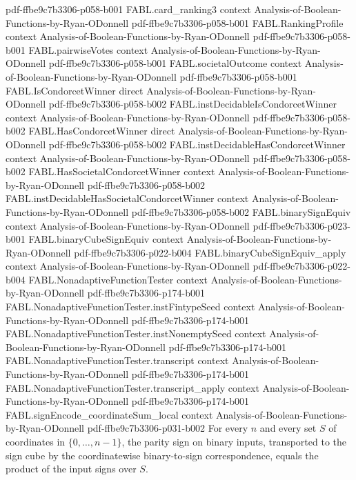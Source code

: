 \begin{theorem}
  {pdf-ffbe9c7b3306-p058-b001}
\proofstep
  {FABL.card_ranking3}
  {context}
  {Analysis-of-Boolean-Functions-by-Ryan-ODonnell}
  {pdf-ffbe9c7b3306-p058-b001}
\proofstep
  {FABL.RankingProfile}
  {context}
  {Analysis-of-Boolean-Functions-by-Ryan-ODonnell}
  {pdf-ffbe9c7b3306-p058-b001}
\proofstep
  {FABL.pairwiseVotes}
  {context}
  {Analysis-of-Boolean-Functions-by-Ryan-ODonnell}
  {pdf-ffbe9c7b3306-p058-b001}
\proofstep
  {FABL.societalOutcome}
  {context}
  {Analysis-of-Boolean-Functions-by-Ryan-ODonnell}
  {pdf-ffbe9c7b3306-p058-b001}
\proofstep
  {FABL.IsCondorcetWinner}
  {direct}
  {Analysis-of-Boolean-Functions-by-Ryan-ODonnell}
  {pdf-ffbe9c7b3306-p058-b002}
\proofstep
  {FABL.instDecidableIsCondorcetWinner}
  {context}
  {Analysis-of-Boolean-Functions-by-Ryan-ODonnell}
  {pdf-ffbe9c7b3306-p058-b002}
\proofstep
  {FABL.HasCondorcetWinner}
  {direct}
  {Analysis-of-Boolean-Functions-by-Ryan-ODonnell}
  {pdf-ffbe9c7b3306-p058-b002}
\proofstep
  {FABL.instDecidableHasCondorcetWinner}
  {context}
  {Analysis-of-Boolean-Functions-by-Ryan-ODonnell}
  {pdf-ffbe9c7b3306-p058-b002}
\proofstep
  {FABL.HasSocietalCondorcetWinner}
  {context}
  {Analysis-of-Boolean-Functions-by-Ryan-ODonnell}
  {pdf-ffbe9c7b3306-p058-b002}
\proofstep
  {FABL.instDecidableHasSocietalCondorcetWinner}
  {context}
  {Analysis-of-Boolean-Functions-by-Ryan-ODonnell}
  {pdf-ffbe9c7b3306-p058-b002}
\proofstep
  {FABL.binarySignEquiv}
  {context}
  {Analysis-of-Boolean-Functions-by-Ryan-ODonnell}
  {pdf-ffbe9c7b3306-p023-b001}
\proofstep
  {FABL.binaryCubeSignEquiv}
  {context}
  {Analysis-of-Boolean-Functions-by-Ryan-ODonnell}
  {pdf-ffbe9c7b3306-p022-b004}
\proofstep
  {FABL.binaryCubeSignEquiv_apply}
  {context}
  {Analysis-of-Boolean-Functions-by-Ryan-ODonnell}
  {pdf-ffbe9c7b3306-p022-b004}
\proofstep
  {FABL.NonadaptiveFunctionTester}
  {context}
  {Analysis-of-Boolean-Functions-by-Ryan-ODonnell}
  {pdf-ffbe9c7b3306-p174-b001}
\proofstep
  {FABL.NonadaptiveFunctionTester.instFintypeSeed}
  {context}
  {Analysis-of-Boolean-Functions-by-Ryan-ODonnell}
  {pdf-ffbe9c7b3306-p174-b001}
\proofstep
  {FABL.NonadaptiveFunctionTester.instNonemptySeed}
  {context}
  {Analysis-of-Boolean-Functions-by-Ryan-ODonnell}
  {pdf-ffbe9c7b3306-p174-b001}
\proofstep
  {FABL.NonadaptiveFunctionTester.transcript}
  {context}
  {Analysis-of-Boolean-Functions-by-Ryan-ODonnell}
  {pdf-ffbe9c7b3306-p174-b001}
\proofstep
  {FABL.NonadaptiveFunctionTester.transcript_apply}
  {context}
  {Analysis-of-Boolean-Functions-by-Ryan-ODonnell}
  {pdf-ffbe9c7b3306-p174-b001}
\proofstep
  {FABL.signEncode_coordinateSum_local}
  {context}
  {Analysis-of-Boolean-Functions-by-Ryan-ODonnell}
  {pdf-ffbe9c7b3306-p031-b002}
For every $n$ and every set $S$ of coordinates in $\{0,\ldots,n-1\}$, the parity sign on
binary inputs, transported to the sign cube by the coordinatewise binary-to-sign
correspondence, equals the product of the input signs over $S$.
\end{theorem}

